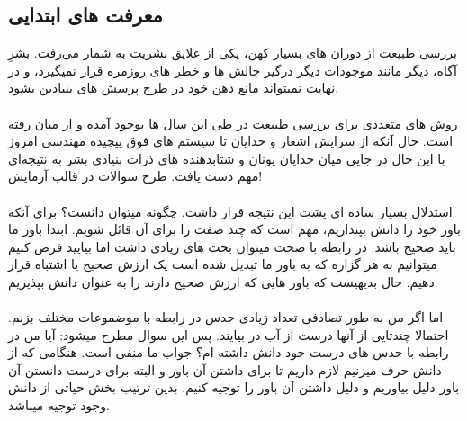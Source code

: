 \documentclass[9pt, twocolumn]{article}
\begin{document}
        \subsection{معرفت های ابتدایی}
            بررسی طبیعت از دوران های بسیار کهن، یکی از علایق بشریت به شمار می‌رفت. بشرِ آگاه، دیگر مانند موجودات دیگر درگیر چالش ها و خطر های روزمره قرار نمیگیرد، و در نهایت نمیتواند مانع ذهن خود در طرح پرسش های بنیادین بشود.
            \\
            \\
            روش های متعددی برای بررسی طبیعت در طی این سال ها بوجود آمده و از میان رفته است. حال آنکه از سرایش اشعار و خدایان تا سیستم های فوق پیچیده مهندسی امروز با این حال در جایی میان خدایان یونان و شتابدهنده های ذرات بنیادی بشر به نتیجه‌ای مهم دست یافت. طرح سوالات در قالب آزمایش!
            \\
            \\
            استدلال بسیار ساده ای پشت این نتیجه قرار داشت. چگونه میتوان دانست؟ برای آنکه باور خود را دانش بپنداریم، مهم است که چند صفت را برای آن قائل شویم. ابتدا باور ما باید صحیح باشد. در رابطه با صحت میتوان بحث های زیادی داشت اما بیایید فرض کنیم میتوانیم به هر گزاره که به باور ما تبدیل شده است یک ارزش صحیح یا اشتباه قرار دهیم. حال بدیهیست که باور هایی که ارزش صحیح دارند را به عنوان دانش بپذیریم. 
            \\
            \\
            اما اگر من به طور تصادفی تعداد زیادی حدس در رابطه با موضموعات مختلف بزنم. احتمالا چندتایی از آنها درست از آب در بیایند. پس این سوال مطرح میشود: آیا من در رابطه با حدس های درست خود دانش داشته ام؟ جواب ما منفی است. هنگامی که از دانش حرف میزنیم لازم داریم تا برای داشتن آن باور و البته برای درست دانستن آن باور دلیل بیاوریم و دلیل داشتن آن باور را توجیه کنیم. بدین ترتیب بخش حیاتی از دانش وجود توجیه میباشد.
\end{document}
